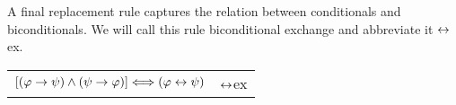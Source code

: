 A final replacement rule captures the relation between conditionals and biconditionals. We will call this rule biconditional exchange and abbreviate it $\leftrightarrow${ex}.

\begin{center}
\begin{tabular}{rl}
$[(\varphi{}\rightarrow\psi{})\wedge(\psi{}\rightarrow\varphi{})] \Longleftrightarrow (\varphi{}\leftrightarrow\psi{})$
& $\leftrightarrow${ex}
\end{tabular}
\end{center}



%
%
%
%
%
%
%
%
%
%
%
